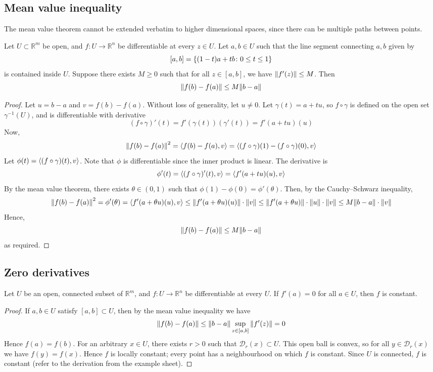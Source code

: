 \subsection{Mean value inequality}
The mean value theorem cannot be extended verbatim to higher dimensional spaces, since there can be multiple paths between points.
\begin{theorem}
	Let \( U \subset \mathbb R^m \) be open, and \( f \colon U \to \mathbb R^n \) be differentiable at every \( z \in U \).
	Let \( a, b \in U \) such that the line segment connecting \( a,b \) given by
	\[
		[a,b] = \qty{(1-t)a + tb \colon 0 \leq t \leq 1}
	\]
	is contained inside \( U \).
	Suppose there exists \( M \geq 0 \) such that for all \( z \in [a,b] \), we have \( \norm{f'(z)} \leq M \).
	Then
	\[
		\norm{f(b) - f(a)} \leq M \norm{b-a}
	\]
\end{theorem}
\begin{proof}
	Let \( u = b - a \) and \( v = f(b) - f(a) \).
	Without loss of generality, let \( u \neq 0 \).
	Let \( \gamma(t) = a + tu \), so \( f \circ \gamma \) is defined on the open set \( \gamma^{-1}(U) \), and is differentiable with derivative
	\[
		(f \circ \gamma)'(t) = f'(\gamma(t))(\gamma'(t)) = f'(a+tu)(u)
	\]
	Now,
	\[
		\norm{f(b) - f(a)}^2 = \left\langle{f(b) - f(a), v}\right\rangle = \left\langle{(f \circ \gamma)(1) - (f \circ \gamma)(0), v}\right\rangle
	\]
	Let \( \phi(t) = \left\langle{(f \circ \gamma)(t), v}\right\rangle \).
	Note that \( \phi \) is differentiable since the inner product is linear.
	The derivative is
	\[
		\phi'(t) = \left\langle{(f \circ \gamma)'(t), v}\right\rangle = \left\langle{f'(a+tu)(u), v}\right\rangle
	\]
	By the mean value theorem, there exists \( \theta \in (0,1) \) such that \( \phi(1) - \phi(0) = \phi'(\theta) \).
	Then, by the Cauchy--Schwarz inequality,
	\[
		\norm{f(b) - f(a)}^2 = \phi'(\theta) = \left\langle{f'(a+\theta u)(u), v}\right\rangle \leq \norm{f'(a+\theta u)(u)} \cdot \norm{v} \leq \norm{f'(a+\theta u)} \cdot \norm{u} \cdot \norm{v} \leq M \norm{b-a} \cdot \norm{v}
	\]
	Hence,
	\[
		\norm{f(b) - f(a)} \leq M \norm{b-a}
	\]
	as required.
\end{proof}

\subsection{Zero derivatives}
\begin{corollary}
	Let \( U \) be an open, connected subset of \( \mathbb R^m \), and \( f \colon U \to \mathbb R^n \) be differentiable at every \( U \).
	If \( f'(a) = 0 \) for all \( a \in U \), then \( f \) is constant.
\end{corollary}
\begin{proof}
	If \( a, b \in U \) satisfy \( [a,b] \subset U \), then by the mean value inequality we have
	\[
		\norm{f(b) - f(a)} \leq \norm{b-a} \sup_{z \in [a,b]} \norm{f'(z)} = 0
	\]
	Hence \( f(a) = f(b) \).
	For an arbitrary \( x \in U \), there exists \( r > 0 \) such that \( \mathcal D_r(x) \subset U \).
	This open ball is convex, so for all \( y \in \mathcal D_r(x) \) we have \( f(y) = f(x) \).
	Hence \( f \) is locally constant; every point has a neighbourhood on which \( f \) is constant.
	Since \( U \) is connected, \( f \) is constant (refer to the derivation from the example sheet).
\end{proof}

